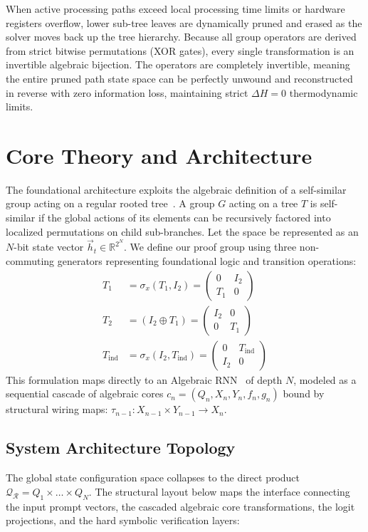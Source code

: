 \documentclass[twocolumn]{article}
\begin{document}
When active processing paths exceed local processing time limits or hardware registers overflow, lower sub-tree leaves are dynamically pruned and erased as the solver moves back up the tree hierarchy. Because all group operators are derived from strict bitwise permutations (XOR gates), every single transformation is an invertible algebraic bijection. The operators are completely invertible, meaning the entire pruned path state space can be perfectly unwound and reconstructed in reverse with zero information loss, maintaining strict $\Delta H = 0$ thermodynamic limits.

\section{Core Theory and Architecture}
The foundational architecture exploits the algebraic definition of a self-similar group acting on a regular rooted tree~\cite{nekrashevych2005}. A group $G$ acting on a tree $T$ is self-similar if the global actions of its elements can be recursively factored into localized permutations on child sub-branches. Let the space be represented as an $N$-bit state vector $\vec{h}_t \in \mathbb{R}^{2^N}$. We define our proof group using three non-commuting generators representing foundational logic and transition operations:
\begin{align}
    T_1 &= \sigma_x (T_1, I_2) = \begin{pmatrix} 0 & I_2 \\ T_1 & 0 \end{pmatrix} \\
    T_2 &= (I_2 \oplus T_1) = \begin{pmatrix} I_2 & 0 \\ 0 & T_1 \end{pmatrix} \\
    T_{\text{ind}} &= \sigma_x (I_2, T_{\text{ind}}) = \begin{pmatrix} 0 & T_{\text{ind}} \\ I_2 & 0 \end{pmatrix}
\end{align}
This formulation maps directly to an Algebraic RNN~\cite{zhu2025reasoning} of depth $N$, modeled as a sequential cascade of algebraic cores $c_n = (Q_n, X_n, Y_n, f_n, g_n)$ bound by structural wiring maps: $\tau_{n-1}: X_{n-1} \times Y_{n-1} \to X_n$.

\subsection{System Architecture Topology}
The global state configuration space collapses to the direct product $\mathcal{Q}_{\mathcal{R}} = Q_1 \times \dots \times Q_N$. The structural layout below maps the interface connecting the input prompt vectors, the cascaded algebraic core transformations, the logit projections, and the hard symbolic verification layers:
\end{document}
